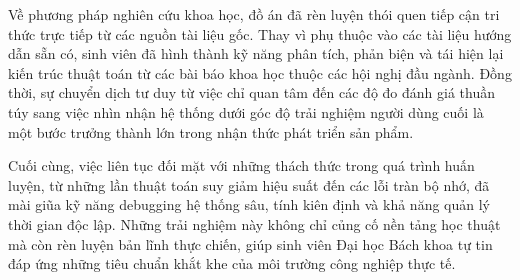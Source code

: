 Về phương pháp nghiên cứu khoa học, đồ án đã rèn luyện thói quen tiếp cận tri thức trực tiếp từ các nguồn tài liệu gốc. Thay vì phụ thuộc vào các tài liệu hướng dẫn sẵn có, sinh viên đã hình thành kỹ năng phân tích, phản biện và tái hiện lại kiến trúc thuật toán từ các bài báo khoa học thuộc các hội nghị đầu ngành. Đồng thời, sự chuyển dịch tư duy từ việc chỉ quan tâm đến các độ đo đánh giá thuần túy sang việc nhìn nhận hệ thống dưới góc độ trải nghiệm người dùng cuối là một bước trưởng thành lớn trong nhận thức phát triển sản phẩm.

Cuối cùng, việc liên tục đối mặt với những thách thức trong quá trình huấn luyện, từ những lần thuật toán suy giảm hiệu suất đến các lỗi tràn bộ nhớ, đã mài giũa kỹ năng debugging hệ thống sâu, tính kiên định và khả năng quản lý thời gian độc lập. Những trải nghiệm này không chỉ củng cố nền tảng học thuật mà còn rèn luyện bản lĩnh thực chiến, giúp sinh viên Đại học Bách khoa tự tin đáp ứng những tiêu chuẩn khắt khe của môi trường công nghiệp thực tế.






































